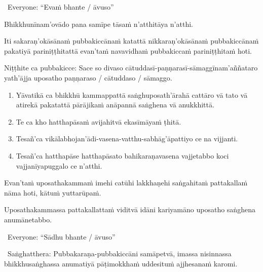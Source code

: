 \begin{center}
  \anglebracketleft\ \hspace{-0.5mm}Everyone: ``Evaṁ bhante / āvuso'' \hspace{-0.5mm}\anglebracketright\
\end{center}

Bhikkhunīnam'ovādo pana samīpe tāsaṁ n'atthitāya n'atthi.

Iti sakaraṇ'okāsānaṁ pubbakiccānaṁ katattā nikkaraṇ'okāsānaṁ pubbakiccānaṁ pakatiyā pariniṭṭhitattā evan'taṁ navavidhaṁ pubbakiccaṁ pariniṭṭhitaṁ hoti.

Niṭṭhite ca pubbakicce: Sace so divaso cātuddasī-paṇṇarasī-sāmaggīnam'aññataro yath'ājja uposatho paṇṇaraso / cātuddaso / sāmaggo.

\begin{enumerate}
  \item Yāvatikā ca bhikkhū kammappattā saṅghuposath'ārahā cattāro vā tato vā atirekā pakatattā pārājikaṁ anāpannā saṅghena vā anukkhittā.
  \item Te ca kho hatthapāsaṁ avijahitvā ekasīmāyaṁ ṭhitā.
  \item Tesañ'ca vikālabhojan'ādi-vasena-vatthu-sabhāg'āpattiyo ce na vijjanti.
  \item Tesañ'ca hatthapāse hatthapāsato bahikaraṇavasena vajjetabbo koci vajjanīyapuggalo ce n'atthi.
\end{enumerate}

Evan'taṁ uposathakammaṁ imehi catūhi lakkhaṇehi saṅgahitaṁ pattakallaṁ nāma hoti, kātuṁ yuttarūpaṁ.

Uposathakammassa pattakallattaṁ viditvā idāni kariyamāno uposatho saṅghena anumānetabbo.


\begin{center}
  \anglebracketleft\ \hspace{-0.5mm}Everyone: ``Sādhu bhante / āvuso'' \hspace{-0.5mm}\anglebracketright\
\end{center}

\begin{center}
  \anglebracketleft\ \hspace{-0.5mm}Saṅghatthera: Pubbakaraṇa-pubbakiccāni samāpetvā, imassa nisinnassa bhikkhusaṅghassa anumatiyā pāṭimokkhaṁ uddesituṁ ajjhesanaṁ karomi. \hspace{-0.5mm}\anglebracketright\
\end{center}

\clearpage
